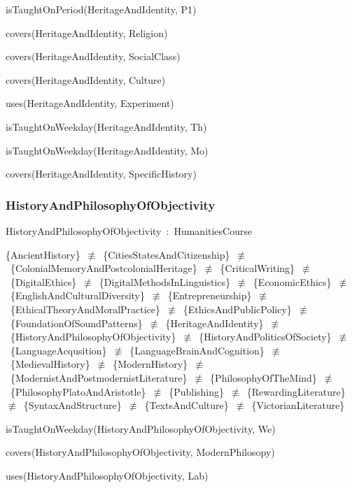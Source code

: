 \documentclass{article}
\begin{document}
isTaughtOnPeriod(HeritageAndIdentity, P1)

covers(HeritageAndIdentity, Religion)

covers(HeritageAndIdentity, SocialClass)

covers(HeritageAndIdentity, Culture)

uses(HeritageAndIdentity, Experiment)

isTaughtOnWeekday(HeritageAndIdentity, Th)

isTaughtOnWeekday(HeritageAndIdentity, Mo)

covers(HeritageAndIdentity, SpecificHistory)

\subsubsection*{HistoryAndPhilosophyOfObjectivity}

HistoryAndPhilosophyOfObjectivity~:~HumanitiesCourse

\{AncientHistory\}~\ensuremath{\not\equiv}~\{CitiesStatesAndCitizenship\}~\ensuremath{\not\equiv}~\{ColonialMemoryAndPostcolonialHeritage\}~\ensuremath{\not\equiv}~\{CriticalWriting\}~\ensuremath{\not\equiv}~\{DigitalEthics\}~\ensuremath{\not\equiv}~\{DigitalMethodsInLinguistics\}~\ensuremath{\not\equiv}~\{EconomicEthics\}~\ensuremath{\not\equiv}~\{EnglishAndCulturalDiversity\}~\ensuremath{\not\equiv}~\{Entrepreneurship\}~\ensuremath{\not\equiv}~\{EthicalTheoryAndMoralPractice\}~\ensuremath{\not\equiv}~\{EthicsAndPublicPolicy\}~\ensuremath{\not\equiv}~\{FoundationOfSoundPatterns\}~\ensuremath{\not\equiv}~\{HeritageAndIdentity\}~\ensuremath{\not\equiv}~\{HistoryAndPhilosophyOfObjectivity\}~\ensuremath{\not\equiv}~\{HistoryAndPoliticsOfSociety\}~\ensuremath{\not\equiv}~\{LanguageAcqusition\}~\ensuremath{\not\equiv}~\{LanguageBrainAndCognition\}~\ensuremath{\not\equiv}~\{MedievalHistory\}~\ensuremath{\not\equiv}~\{ModernHistory\}~\ensuremath{\not\equiv}~\{ModernistAndPostmodernistLiterature\}~\ensuremath{\not\equiv}~\{PhilosophyOfTheMind\}~\ensuremath{\not\equiv}~\{PhilosophyPlatoAndAristotle\}~\ensuremath{\not\equiv}~\{Publishing\}~\ensuremath{\not\equiv}~\{RewardingLiterature\}~\ensuremath{\not\equiv}~\{SyntaxAndStructure\}~\ensuremath{\not\equiv}~\{TextsAndCulture\}~\ensuremath{\not\equiv}~\{VictorianLiterature\}

isTaughtOnWeekday(HistoryAndPhilosophyOfObjectivity, We)

covers(HistoryAndPhilosophyOfObjectivity, ModernPhilosopy)

uses(HistoryAndPhilosophyOfObjectivity, Lab)
\end{document}
